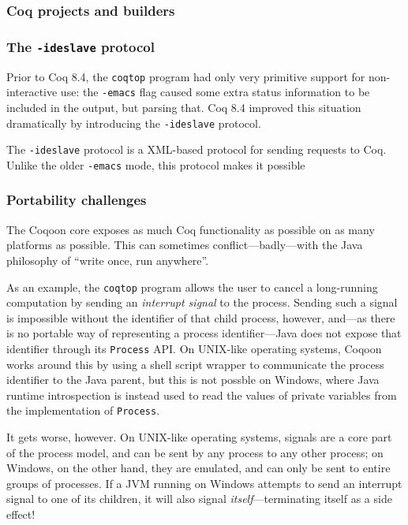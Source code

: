\documentclass{article}
\newcommand{\fdef}[1]{\textit{#1}}
\begin{document}
\subsubsection{Coq projects and builders}

\subsubsection{The \texttt{-ideslave} protocol}

Prior to Coq 8.4, the \texttt{coqtop} program had only very primitive support
for non-interactive use: the \texttt{-emacs} flag caused some extra status
information to be included in the output, but parsing that. Coq 8.4 improved this situation
dramatically by introducing the \texttt{-ideslave} protocol.

The \texttt{-ideslave} protocol is a XML-based protocol for sending requests
to Coq. Unlike the older \texttt{-emacs} mode, this protocol makes it possible

\subsubsection{Portability challenges}

The Coqoon core exposes as much Coq functionality as possible on as many
platforms as possible. This can sometimes conflict---badly---with the Java
philosophy of ``write once, run anywhere''.

As an example, the \texttt{coqtop} program allows the user to cancel a
long-running computation by sending an \fdef{interrupt signal} to the process.
Sending such a signal is impossible without the identifier of that child
process, however, and---as there is no portable way of representing a process
identifier---Java does not expose that identifier through its \texttt{Process}
API. On UNIX-like operating systems, Coqoon works around this by using a shell
script wrapper to communicate the process identifier to the Java parent, but
this is not possble on Windows, where Java runtime introspection is instead
used to read the values of private variables from the implementation of
\texttt{Process}.

It gets worse, however. On UNIX-like operating systems, signals are a core part
of the process model, and can be sent by any process to any other process; on
Windows, on the other hand, they are emulated, and can only be sent to entire
groups of processes. If a JVM running on Windows attempts to send an interrupt
signal to one of its children, it will also signal \emph{itself}---terminating
itself as a side effect!
\end{document}
